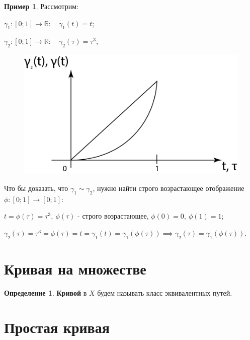 \documentclass{report}
\theoremstyle{definition}
\newtheorem*{definition}{Определение}
\newtheorem*{example}{Пример}
\begin{document}
\begin{example}
    Рассмотрим:

    $\gamma_1: [0;1] \rightarrow \mathbb{R}: \quad \gamma_1(t) = t$;

    $\gamma_2: [0;1] \rightarrow \mathbb{R}: \quad \gamma_2(\tau) = \tau^3$,

    \begin{figure}[H]
        \begin{center}
            \includegraphics[scale=0.2]{graph8.png}\label{figure8}
        \end{center}
    \end{figure}

    Что бы доказать, что $\gamma_1 \sim \gamma_2$, нужно найти строго возрастающее отображение
    $\phi:[0;1]\rightarrow[0;1]$:

    $t = \phi(\tau) = \tau^3, \ \phi(\tau)$ - строго возрастающее, $\phi(0) = 0, \ \phi(1) = 1$;

    $\gamma_2(\tau) = \tau^3 = \phi(\tau) = t = \gamma_1(t) = \gamma_1(\phi(\tau)) \implies
        \gamma_2(\tau) = \gamma_1(\phi(\tau))$.
\end{example}

\section{Кривая на множестве}

\begin{definition}
    \textbf{Кривой} в $X$ будем называть класс эквивалентных путей.
\end{definition}

\section{Простая кривая}
\end{document}
